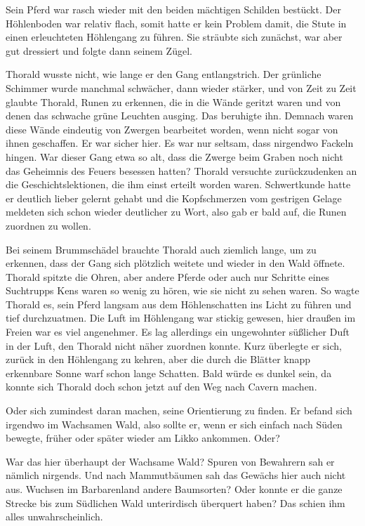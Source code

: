 Sein Pferd war rasch wieder mit den beiden mächtigen Schilden bestückt. Der Höhlenboden war relativ flach, somit hatte er kein Problem damit, die Stute in einen erleuchteten Höhlengang zu führen. Sie sträubte sich zunächst, war aber gut dressiert und folgte dann seinem Zügel.

Thorald wusste nicht, wie lange er den Gang entlangstrich. Der grünliche Schimmer wurde manchmal schwächer, dann wieder stärker, und von Zeit zu Zeit glaubte Thorald, Runen zu erkennen, die in die Wände geritzt waren und von denen das schwache grüne Leuchten ausging. Das beruhigte ihn. Demnach waren diese Wände eindeutig von Zwergen bearbeitet worden, wenn nicht sogar von ihnen geschaffen. Er war sicher hier. Es war nur seltsam, dass nirgendwo Fackeln hingen. War dieser Gang etwa so alt, dass die Zwerge beim Graben noch nicht das Geheimnis des Feuers besessen hatten? Thorald versuchte zurückzudenken an die Geschichtslektionen, die ihm einst erteilt worden waren. Schwertkunde hatte er deutlich lieber gelernt gehabt und die Kopfschmerzen vom gestrigen Gelage meldeten sich schon wieder deutlicher zu Wort, also gab er bald auf, die Runen zuordnen zu wollen.


Bei seinem Brummschädel brauchte Thorald auch ziemlich lange, um zu erkennen, dass der Gang sich plötzlich weitete und wieder in den Wald öffnete. Thorald spitzte die Ohren, aber andere Pferde oder auch nur Schritte eines Suchtrupps Kens waren so wenig zu hören, wie sie nicht zu sehen waren. So wagte Thorald es, sein Pferd langsam aus dem Höhlenschatten ins Licht zu führen und tief durchzuatmen. Die Luft im Höhlengang war stickig gewesen, hier draußen im Freien war es viel angenehmer. Es lag allerdings ein ungewohnter süßlicher Duft in der Luft, den Thorald nicht näher zuordnen konnte. Kurz überlegte er sich, zurück in den Höhlengang zu kehren, aber die durch die Blätter knapp erkennbare Sonne warf schon lange Schatten. Bald würde es dunkel sein, da konnte sich Thorald doch schon jetzt auf den Weg nach Cavern machen.

Oder sich zumindest daran machen, seine Orientierung zu finden. Er befand sich irgendwo im Wachsamen Wald, also sollte er, wenn er sich einfach nach Süden bewegte, früher oder später wieder am Likko ankommen. Oder?

War das hier überhaupt der Wachsame Wald? Spuren von Bewahrern sah er nämlich nirgends. Und nach Mammutbäumen sah das Gewächs hier auch nicht aus. Wuchsen im Barbarenland andere Baumsorten? Oder konnte er die ganze Strecke bis zum Südlichen Wald unterirdisch überquert haben? Das schien ihm alles unwahrscheinlich.

